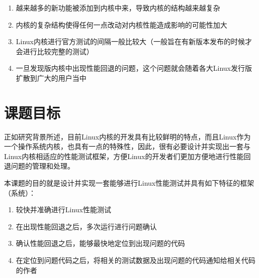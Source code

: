 \begin{enumerate}
\item 越来越多的新功能被添加到内核中来，导致内核的结构越来越复杂
\item 内核的复杂结构使得任何一点改动对内核性能造成影响的可能性加大
\item Linux内核进行官方测试的间隔一般比较大（一般旨在有新版本发布的时候才会进行比较完整的测试）
\item 一旦发现版内核中出现性能回退的问题，这个问题就会随着各大Linux发行版扩散到广大的用户当中
\end{enumerate}

\section{课题目标}

正如研究背景所述，目前Linux内核的开发具有比较鲜明的特点，而且Linux作为一个操作系统内核，也具有一点的特殊性，因此，很有必要设计并实现出一套与Linux内核相适应的性能测试框架，方便Linux的开发者们更加方便地进行性能回退问题的管理和处理。

本课题的目的就是设计并实现一套能够进行Linux性能测试并具有如下特征的框架（系统）：

\begin{enumerate}
\item 较快并准确进行Linux性能测试
\item 在出现性能回退之后，多次运行进行问题确认
\item 确认性能回退之后，能够最快地定位到出现问题的代码
\item 在定位到问题代码之后，将相关的测试数据及出现问题的代码通知给相关代码的作者
\end{enumerate}